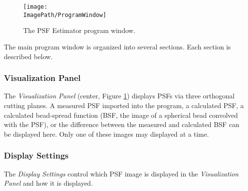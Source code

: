 \documentclass[11pt,titlepage,twoside]{article}
\begin{document}
\begin{figure}[h]
  \centering
  \texttt{[image: \\ImagePath/ProgramWindow]}
  \caption{The PSF Estimator program window.}
  \label{fig:ProgramWindow}
\end{figure}

The main program window is organized into several sections. Each section is described below.

\subsubsection{Visualization Panel}

The \emph{Visualization Panel} (center, Figure \ref{fig:ProgramWindow}) displays PSFs via three orthogonal cutting planes. A measured PSF imported into the program, a calculated PSF, a calculated bead-spread function (BSF, the image of a spherical bead convolved with the PSF), or the difference between the measured and calculated BSF can be displayed here. Only one of these images may displayed at a time.

\subsubsection{Display Settings}

The \emph{Display Settings} control which PSF image is displayed in the \emph{Visualization Panel} and how it is displayed.
\end{document}
